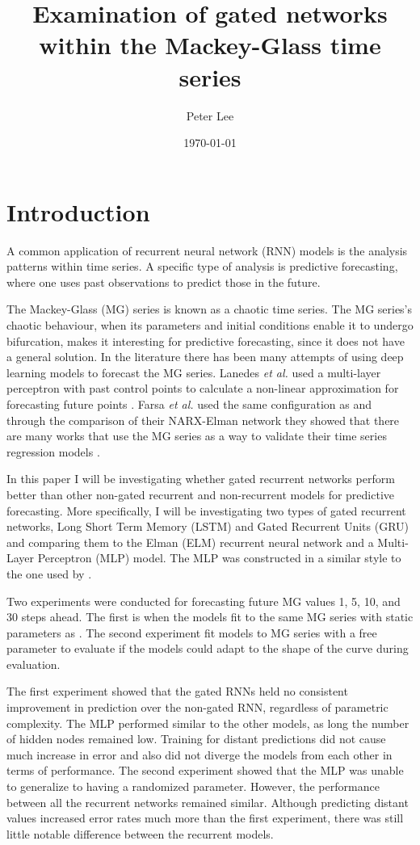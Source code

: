 \documentclass[11pt]{article}
\author{Peter Lee}
\date{\today}
\title{Examination of gated networks within the Mackey-Glass time series}
\begin{document}
\maketitle

\section{Introduction}
A common application of recurrent neural network (RNN) models is the
analysis patterns within time series. A specific
type of analysis is predictive forecasting, where one uses past
observations to predict those in the future. 

The Mackey-Glass (MG) series \cite{MG} is known as a chaotic time series.
The MG series's chaotic behaviour, when its parameters and initial
conditions enable it to undergo bifurcation, makes it interesting
for predictive forecasting, since it does not have a general
solution. In the literature there has been many attempts of using deep
learning models to forecast the MG
series. Lanedes \textit{et al.} used a multi-layer perceptron with past control
points to calculate a non-linear approximation for forecasting future
points \cite{tr}. Farsa \textit{et al.} used the same configuration as
\cite{tr} and through the comparison of their NARX-Elman network they showed
that there are many works that use the MG series as a way to validate
their time series regression models \cite{Farsa}.

In this paper I will be investigating whether gated recurrent networks
perform better than other non-gated recurrent and non-recurrent models for predictive
forecasting. More specifically, I will be investigating two types of
gated recurrent networks, Long Short Term Memory (LSTM) \cite{LSTM}
and Gated Recurrent Units (GRU) \cite{GRU} and comparing them to the Elman (ELM) recurrent neural network and a Multi-Layer Perceptron (MLP) model. The MLP was constructed in a similar style to the one used by \cite{tr}.

Two experiments were conducted for forecasting future MG values 1, 5,
10, and 30 steps ahead. The first is when the models fit to the same MG series with static parameters as \cite{tr,Farsa}. The second experiment fit models to MG series with
a free parameter to evaluate if the models could adapt to the shape of
the curve during evaluation. 

The first experiment showed that the gated RNNs held no consistent improvement in prediction over
the non-gated RNN, regardless of parametric complexity. The
MLP performed similar to the other models, as long the number of hidden nodes
remained low. Training for distant predictions did not cause much
increase in error and also did not diverge the
models from each other in terms of performance. The second experiment showed that the MLP was unable to generalize to
having a randomized parameter. However, the performance between all the
recurrent networks remained similar. Although predicting distant
values increased error rates much more than the first experiment,
there was still little notable difference between the recurrent
models.
\end{document}
